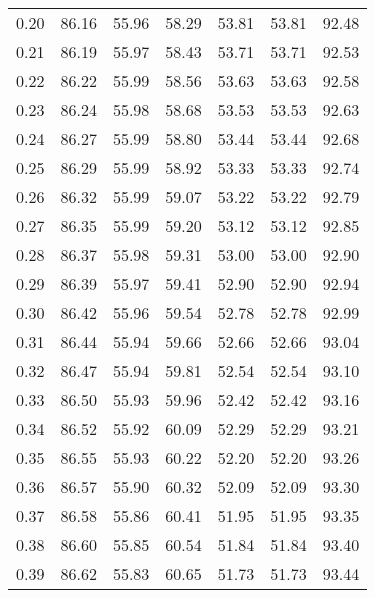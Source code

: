 \begin{tabular}{|c|c|c|c|c|c|c|}
      0.20 &     86.16 &     55.96 &      58.29 &   53.81 &      53.81 &         92.48 \\
      0.21 &     86.19 &     55.97 &      58.43 &   53.71 &      53.71 &         92.53 \\
      0.22 &     86.22 &     55.99 &      58.56 &   53.63 &      53.63 &         92.58 \\
      0.23 &     86.24 &     55.98 &      58.68 &   53.53 &      53.53 &         92.63 \\
      0.24 &     86.27 &     55.99 &      58.80 &   53.44 &      53.44 &         92.68 \\
      0.25 &     86.29 &     55.99 &      58.92 &   53.33 &      53.33 &         92.74 \\
      0.26 &     86.32 &     55.99 &      59.07 &   53.22 &      53.22 &         92.79 \\
      0.27 &     86.35 &     55.99 &      59.20 &   53.12 &      53.12 &         92.85 \\
      0.28 &     86.37 &     55.98 &      59.31 &   53.00 &      53.00 &         92.90 \\
      0.29 &     86.39 &     55.97 &      59.41 &   52.90 &      52.90 &         92.94 \\
      0.30 &     86.42 &     55.96 &      59.54 &   52.78 &      52.78 &         92.99 \\
      0.31 &     86.44 &     55.94 &      59.66 &   52.66 &      52.66 &         93.04 \\
      0.32 &     86.47 &     55.94 &      59.81 &   52.54 &      52.54 &         93.10 \\
      0.33 &     86.50 &     55.93 &      59.96 &   52.42 &      52.42 &         93.16 \\
      0.34 &     86.52 &     55.92 &      60.09 &   52.29 &      52.29 &         93.21 \\
      0.35 &     86.55 &     55.93 &      60.22 &   52.20 &      52.20 &         93.26 \\
      0.36 &     86.57 &     55.90 &      60.32 &   52.09 &      52.09 &         93.30 \\
      0.37 &     86.58 &     55.86 &      60.41 &   51.95 &      51.95 &         93.35 \\
      0.38 &     86.60 &     55.85 &      60.54 &   51.84 &      51.84 &         93.40 \\
      0.39 &     86.62 &     55.83 &      60.65 &   51.73 &      51.73 &         93.44 \\

\end{tabular}
